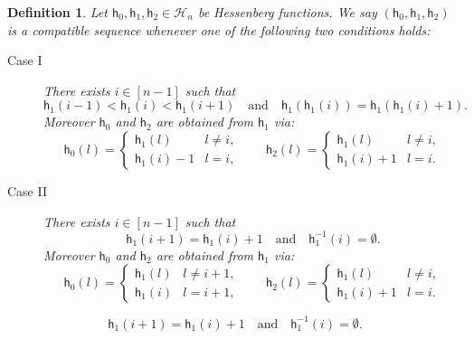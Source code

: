\documentclass[10pt,a4paper]{amsart}
\newtheorem{definition}{Definition}
\newcommand{\hes}{\mathsf{h}}
\begin{document}
\begin{definition}\label{triple_cond} Let $\hes_0, \hes_1, \hes_2 \in \mathcal{H}_n$ be Hessenberg functions. We say $(\hes_0,\hes_1,\hes_2)$ is a compatible sequence whenever one of the following two conditions holds:

\begin{description}
\item[Case I] There exists $i \in [n-1]$ such that 
\begin{equation}\label{caseI_h}
\hes_1(i-1) < \hes_1(i) < \hes_1(i+1)\quad \text{and}\quad \hes_1(\hes_1(i)) = \hes_1(\hes_1(i)+1).
\end{equation}
Moreover $\hes_0$ and $\hes_2$ are obtained from $\hes_1$ via:
\begin{equation}\label{caseI_modular}
\hes_0(l)= 
\begin{cases}
\hes_1(l) &  l \neq i, \\
\hes_1(i) - 1 &  l = i,
\end{cases} \qquad
\hes_2(l) = 
\begin{cases}
\hes_1(l) & l \neq i, \\
\hes_1(i) + 1 & l = i.
\end{cases}
\end{equation}
\medskip

\item[Case II] There exists $i \in [n-1]$ such that 
\begin{equation}\label{caseII_h}
\hes_1(i+1) = \hes_1(i)+1\quad \text{and}\quad \hes_1^{-1}(i) = \emptyset.
\end{equation}
Moreover $\hes_0$ and $\hes_2$ are obtained from $\hes_1$ via:
\begin{equation}\label{caseII_modular}
\hes_0(l) = 
\begin{cases}
\hes_1(l) &  l \neq i+1, \\
\hes_1(i) &  l = i+1,
\end{cases} \qquad
\hes_2(l) = 
\begin{cases}
\hes_1(l) & l \neq i, \\
\hes_1(i)+1 &  l= i.
\end{cases}
\end{equation}
\end{description}
\end{definition}

\begin{equation}
\hes_1(i+1) = \hes_1(i)+1\quad \text{and}\quad \hes_1^{-1}(i) = \emptyset.
\end{equation}
\end{document}

